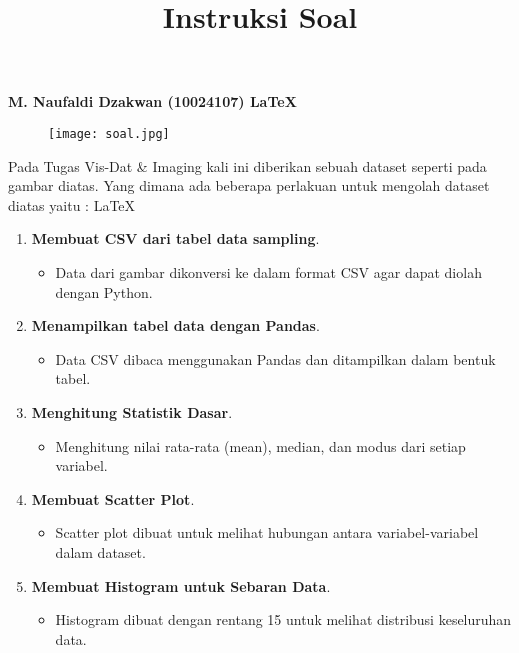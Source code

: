 \documentclass[
  course = {{Data Visualisasi dan Pemrosesan Citra}},
  assignment = 2,
  name = {{Dosen Pengampu Matkul 1 ; Dosen Pengampu Matkul 2}},
  studentnumber = {{ ; }},
  email = {{Prof. Dr. Suprijadi, M.Eng. ; Dr. Irfan Dwi Aditya, S.Si., M.Si.}},
  firstexercise = 1
]{aga-homework}
\begin{document}
\begin{center}
    \textbf{M. Naufaldi Dzakwan (10024107) \LaTeX{}}
\end{center}

\begin{figure}[h!]
    \centering
    \texttt{[image: soal.jpg]}
    \label{fig:enter-label}
\end{figure}

\title{\textbf{Instruksi Soal}}

 Pada Tugas Vis-Dat & Imaging kali ini diberikan sebuah dataset seperti pada gambar diatas. Yang dimana ada beberapa perlakuan untuk mengolah dataset diatas yaitu : \LaTeX{} 

\begin{enumerate}
    \item \textbf{Membuat CSV dari tabel data sampling}.
    \begin{itemize}
        \item Data dari gambar dikonversi ke dalam format CSV agar dapat diolah dengan Python.
    \end{itemize}
    
    \item \textbf{Menampilkan tabel data dengan Pandas}.
    \begin{itemize}
        \item Data CSV dibaca menggunakan Pandas dan ditampilkan dalam bentuk tabel.
    \end{itemize}
    
    \item \textbf{Menghitung Statistik Dasar}.
    \begin{itemize}
        \item Menghitung nilai rata-rata (mean), median, dan modus dari setiap variabel.
    \end{itemize}
    
    \item \textbf{Membuat Scatter Plot}.
    \begin{itemize}
        \item Scatter plot dibuat untuk melihat hubungan antara variabel-variabel dalam dataset.
    \end{itemize}
    
    \item \textbf{Membuat Histogram untuk Sebaran Data}.
    \begin{itemize}
        \item Histogram dibuat dengan rentang 15 untuk melihat distribusi keseluruhan data.
    \end{itemize}
    

\end{enumerate}
\end{document}
